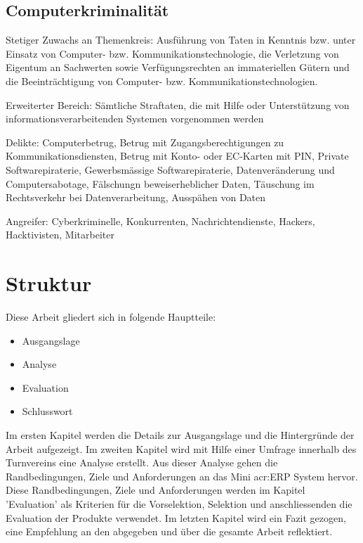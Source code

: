 \subsection{Computerkriminalität}
Stetiger Zuwachs an
Themenkreis: Ausführung von Taten in Kenntnis bzw. unter Einsatz von Computer- bzw. Kommunikationstechnologie, die Verletzung von Eigentum an Sachwerten sowie Verfügungsrechten an immateriellen Gütern und die Beeinträchtigung von Computer- bzw. Kommunikationstechnologien.

Erweiterter Bereich: Sämtliche Straftaten, die mit Hilfe oder Unterstützung von informationsverarbeitenden Systemen vorgenommen werden

Delikte: Computerbetrug, Betrug mit Zugangsberechtigungen zu Kommunikationsdiensten, Betrug mit Konto- oder EC-Karten mit PIN, Private Softwarepiraterie, Gewerbsmässige Softwarepiraterie, Datenveränderung und Computersabotage, Fälschungn beweiserheblicher Daten, Täuschung im Rechtsverkehr bei Datenverarbeitung, Ausspähen von Daten

Angreifer: Cyberkriminelle, Konkurrenten, Nachrichtendienste, Hackers, Hacktivisten, Mitarbeiter

\section{Struktur}
Diese Arbeit gliedert sich in folgende Hauptteile:
\begin{itemize}
\item Ausgangslage
\item Analyse
\item Evaluation
\item Schlusswort
\end{itemize}

Im ersten Kapitel werden die Details zur Ausgangslage und die Hintergründe der Arbeit aufgezeigt. Im zweiten Kapitel wird mit Hilfe einer Umfrage innerhalb des Turnvereins eine Analyse erstellt. Aus dieser Analyse gehen die Randbedingungen, Ziele und Anforderungen an das Mini \gls{acr:ERP} System hervor. Diese Randbedingungen, Ziele und Anforderungen werden im Kapitel 'Evaluation' als Kriterien für die Vorselektion, Selektion und anschliessenden die Evaluation der Produkte verwendet. Im letzten Kapitel wird ein Fazit gezogen, eine Empfehlung an den  abgegeben und über die gesamte Arbeit reflektiert.

